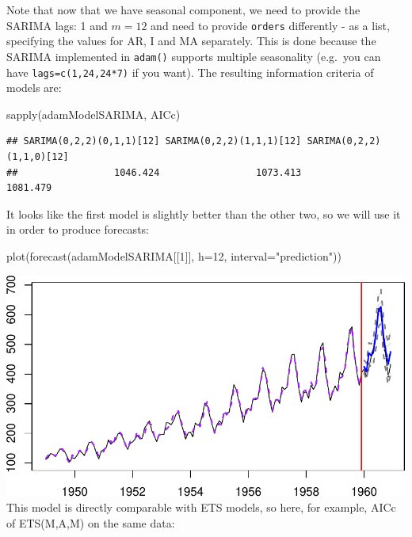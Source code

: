 \documentclass[
]{book}
\newenvironment{Shaded}{\begin{snugshade}}{\end{snugshade}}
\newcommand{\AttributeTok}[1]{\textcolor[rgb]{0.77,0.63,0.00}{#1}}
\newcommand{\DecValTok}[1]{\textcolor[rgb]{0.00,0.00,0.81}{#1}}
\newcommand{\FunctionTok}[1]{\textcolor[rgb]{0.00,0.00,0.00}{#1}}
\newcommand{\NormalTok}[1]{#1}
\newcommand{\StringTok}[1]{\textcolor[rgb]{0.31,0.60,0.02}{#1}}
\theoremstyle{definition}
\theoremstyle{definition}
\theoremstyle{definition}
\theoremstyle{definition}
\theoremstyle{remark}
\begin{document}
Note that now that we have seasonal component, we need to provide the SARIMA lags: 1 and \(m=12\) and need to provide \texttt{orders} differently - as a list, specifying the values for AR, I and MA separately. This is done because the SARIMA implemented in \texttt{adam()} supports multiple seasonality (e.g.~you can have \texttt{lags=c(1,24,24*7)} if you want). The resulting information criteria of models are:

\begin{Shaded}
\begin{Highlighting}[]
\FunctionTok{sapply}\NormalTok{(adamModelSARIMA, AICc)}
\end{Highlighting}
\end{Shaded}

\begin{verbatim}
## SARIMA(0,2,2)(0,1,1)[12] SARIMA(0,2,2)(1,1,1)[12] SARIMA(0,2,2)(1,1,0)[12] 
##                 1046.424                 1073.413                 1081.479
\end{verbatim}

It looks like the first model is slightly better than the other two, so we will use it in order to produce forecasts:

\begin{Shaded}
\begin{Highlighting}[]
\FunctionTok{plot}\NormalTok{(}\FunctionTok{forecast}\NormalTok{(adamModelSARIMA[[}\DecValTok{1}\NormalTok{]], }\AttributeTok{h=}\DecValTok{12}\NormalTok{, }\AttributeTok{interval=}\StringTok{"prediction"}\NormalTok{))}
\end{Highlighting}
\end{Shaded}

\includegraphics{adam_files/figure-latex/adamSARIMAPlotAir-1.pdf}
This model is directly comparable with ETS models, so here, for example, AICc of ETS(M,A,M) on the same data:
\end{document}
